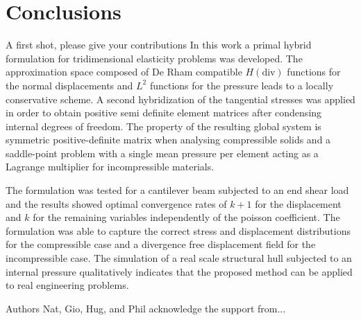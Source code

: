 \documentclass[english,11pt,3p,number,sort&compress]{elsarticle}
\newcommand{\giovane}{\color{red}{\bf\Large GA} \color{cyan} }
\begin{document}
\section{Conclusions}

{\giovane A first shot, please give your contributions}
In this work a primal hybrid formulation for tridimensional elasticity problems was developed. The approximation space composed of De Rham compatible $H(\text{div})$ functions for the normal displacements and  $L^2$ functions for the pressure leads to a locally conservative scheme. A second hybridization of the tangential stresses was applied in order to obtain positive semi definite element matrices after condensing internal degrees of freedom. The property of the resulting global system is  symmetric positive-definite matrix when analysing compressible solids and a saddle-point problem with a single mean pressure per element acting as a Lagrange multiplier for incompressible materials.

The formulation was tested for a cantilever beam subjected to an end shear load and the results showed optimal convergence rates of $k+1$ for the displacement and $k$ for the remaining variables independently of the poisson coefficient. The formulation was able to capture the correct stress and displacement distributions for the compressible case and a divergence free displacement field for the incompressible case. The simulation of a real scale structural hull subjected to an internal pressure qualitatively indicates that the proposed method can be applied to real engineering problems.

\bigskip{} Authors  Nat, Gio, Hug, and Phil acknowledge the support from...

%


\end{document}
